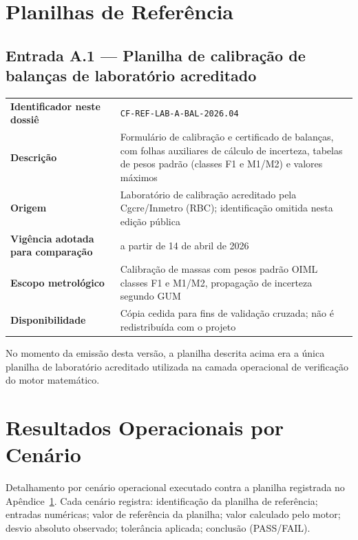 \documentclass[11pt,a4paper]{article}
\begin{document}
\appendix

\section{Planilhas de Referência}
\label{app:planilhas}

\subsection{Entrada A.1 --- Planilha de calibração de balanças de laboratório acreditado}

\begin{tabularx}{\textwidth}{l X}
  \toprule
  \textbf{Identificador neste dossiê} & \texttt{CF-REF-LAB-A-BAL-2026.04} \\
  \textbf{Descrição} & Formulário de calibração e certificado de balanças, com folhas auxiliares de cálculo de incerteza, tabelas de pesos padrão (classes F1 e M1/M2) e valores máximos \\
  \textbf{Origem} & Laboratório de calibração acreditado pela Cgcre/Inmetro (RBC); identificação omitida nesta edição pública \\
  \textbf{Vigência adotada para comparação} & a partir de 14 de abril de 2026 \\
  \textbf{Escopo metrológico} & Calibração de massas com pesos padrão OIML classes F1 e M1/M2, propagação de incerteza segundo GUM \\
  \textbf{Disponibilidade} & Cópia cedida para fins de validação cruzada; não é redistribuída com o projeto \\
  \bottomrule
\end{tabularx}

\vspace{0.3cm}
No momento da emissão desta versão, a planilha descrita acima era a única planilha de laboratório acreditado utilizada na camada operacional de verificação do motor matemático.

\section{Resultados Operacionais por Cenário}
\label{app:planilhas-resultados}

Detalhamento por cenário operacional executado contra a planilha registrada no Apêndice~\ref{app:planilhas}. Cada cenário registra: identificação da planilha de referência; entradas numéricas; valor de referência da planilha; valor calculado pelo motor; desvio absoluto observado; tolerância aplicada; conclusão (\textsf{PASS}/\textsf{FAIL}).
\end{document}
